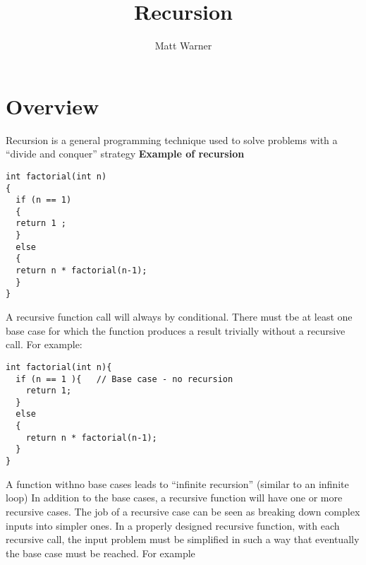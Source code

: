 \documentclass{report}
\title{\Huge{Recursion}}
\author{\huge{Matt Warner}}
\date{\huge{}}
\begin{document}
  \maketitle
\section{Overview}
Recursion is a general programming technique used to solve problems with a ``divide and conquer'' strategy
\bigbreak \noindent
{}
\bigbreak \noindent
\textbf{Example of recursion}
\begin{mdframed}
\begin{verbatim}
int factorial(int n)
{
  if (n == 1)
  {
  return 1 ;
  }
  else
  {
  return n * factorial(n-1);
  }
}
\end{verbatim}
\end{mdframed}
\bigbreak \noindent
A recursive function call will always by conditional. There must tbe at least one base case for which the function produces a result trivially without a recursive call. For example:
\begin{mdframed}
\begin{verbatim}
int factorial(int n){
  if (n == 1 ){   // Base case - no recursion
    return 1;
  }
  else
  {
    return n * factorial(n-1);
  }
}
\end{verbatim}
\end{mdframed}
\bigbreak \noindent
A function withno base cases leads to ``infinite recursion'' (similar to an infinite loop)
\bigbreak \noindent
In addition to the base cases, a recursive function will have one or more recursive cases. The job of a recursive case can be seen as breaking down complex inputs into simpler ones.
\bigbreak \noindent
In a properly designed recursive function, with each recursive call, the input problem must be simplified in such a way that eventually the base case must be reached. For example
\end{document}
